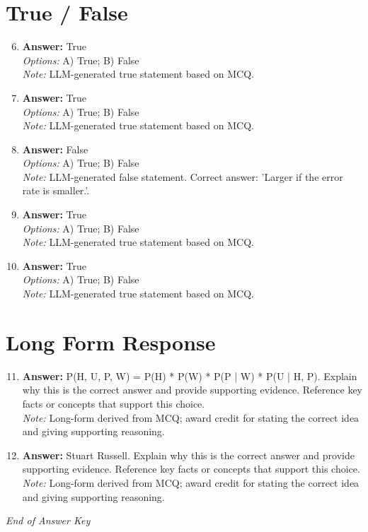 \documentclass[12pt]{article}
\begin{document}
\section*{True / False}
\begin{enumerate}[label=\arabic*.]
\setcounter{enumi}{5}
\item \textbf{Answer:} True
\\ \textit{Options:} A) True; B) False
\\ \textit{Note:} LLM-generated true statement based on MCQ.
\item \textbf{Answer:} True
\\ \textit{Options:} A) True; B) False
\\ \textit{Note:} LLM-generated true statement based on MCQ.
\item \textbf{Answer:} False
\\ \textit{Options:} A) True; B) False
\\ \textit{Note:} LLM-generated false statement. Correct answer: 'Larger if the error rate is smaller.'.
\item \textbf{Answer:} True
\\ \textit{Options:} A) True; B) False
\\ \textit{Note:} LLM-generated true statement based on MCQ.
\item \textbf{Answer:} True
\\ \textit{Options:} A) True; B) False
\\ \textit{Note:} LLM-generated true statement based on MCQ.
\end{enumerate}

\section*{Long Form Response}
\begin{enumerate}[label=\arabic*.]
\setcounter{enumi}{10}
\item \textbf{Answer:} P(H, U, P, W) = P(H) * P(W) * P(P | W) * P(U | H, P). Explain why this is the correct answer and provide supporting evidence. Reference key facts or concepts that support this choice.
\\ \textit{Note:} Long-form derived from MCQ; award credit for stating the correct idea and giving supporting reasoning.
\item \textbf{Answer:} Stuart Russell. Explain why this is the correct answer and provide supporting evidence. Reference key facts or concepts that support this choice.
\\ \textit{Note:} Long-form derived from MCQ; award credit for stating the correct idea and giving supporting reasoning.
\end{enumerate}

\vfill
\noindent\textit{End of Answer Key}
\end{document}
